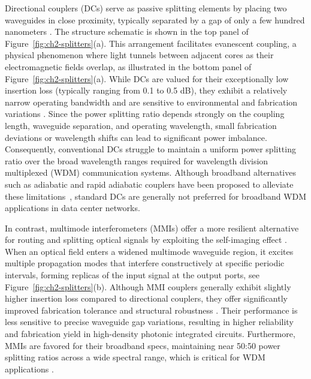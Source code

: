Directional couplers (DCs) serve as passive splitting elements by placing two waveguides in close proximity, typically separated by a gap of only a few hundred nanometers \cite{AGRAWAL202157, tormen2005wavelength, chen2017broadband}.
The structure schematic is shown in the top panel of Figure~\ref{fig:ch2-splitters}(a).
This arrangement facilitates evanescent coupling, a physical phenomenon where light tunnels between adjacent cores as their electromagnetic fields overlap, as illustrated in the bottom panel of Figure~\ref{fig:ch2-splitters}(a).
While DCs are valued for their exceptionally low insertion loss (typically ranging from 0.1 to 0.5 dB), they exhibit a relatively narrow operating bandwidth and are sensitive to environmental and fabrication variations \cite{xu2019low, darmawan2005rigorous}.
Since the power splitting ratio depends strongly on the coupling length, waveguide separation, and operating wavelength, small fabrication deviations or wavelength shifts can lead to significant power imbalance.
Consequently, conventional DCs struggle to maintain a uniform power splitting ratio over the broad wavelength ranges required for wavelength division multiplexed (WDM) communication systems.
Although broadband alternatives such as adiabatic and rapid adiabatic couplers have been proposed to alleviate these limitations~\cite{sun2016adiabatic}, standard DCs are generally not preferred for broadband WDM applications in data center networks.

In contrast, multimode interferometers (MMIs) offer a more resilient alternative for routing and splitting optical signals by exploiting the self-imaging effect \cite{ansys_mmi_coupler, soldano2002optical}.
When an optical field enters a widened multimode waveguide region, it excites multiple propagation modes that interfere constructively at specific periodic intervals, forming replicas of the input signal at the output ports, see Figure~\ref{fig:ch2-splitters}(b).
Although MMI couplers generally exhibit slightly higher insertion loss compared to directional couplers, they offer significantly improved fabrication tolerance and structural robustness \cite{solehmainen2006adiabatic, hosseini20111, sheng2012compact}.
Their performance is less sensitive to precise waveguide gap variations, resulting in higher reliability and fabrication yield in high-density photonic integrated circuits.
Furthermore, MMIs are favored for their broadband specs, maintaining near 50:50 power splitting ratios across a wide spectral range, which is critical for WDM applications \cite{maese2013wavelength}.

